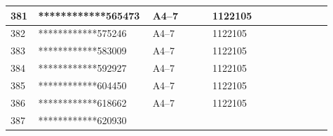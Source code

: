 \documentclass[UTF8,10pt,a4paper,fontset=fandol]{ctexart}
\newcommand{\fieldvalue}[1]{#1}
\begin{document}
\begin{center}
\begin{tabular}{|p{0.08\linewidth}|p{0.29\linewidth}|p{0.18\linewidth}|p{0.18\linewidth}|p{0.18\linewidth}|}
\fieldvalue{381}
&
\fieldvalue{************565473}
&
\fieldvalue{A4--7}
&
\fieldvalue{1122105}
& \\ \hline
\fieldvalue{382}
&
\fieldvalue{************575246}
&
\fieldvalue{A4--7}
&
\fieldvalue{1122105}
& \\ \hline
\fieldvalue{383}
&
\fieldvalue{************583009}
&
\fieldvalue{A4--7}
&
\fieldvalue{1122105}
& \\ \hline
\fieldvalue{384}
&
\fieldvalue{************592927}
&
\fieldvalue{A4--7}
&
\fieldvalue{1122105}
& \\ \hline
\fieldvalue{385}
&
\fieldvalue{************604450}
&
\fieldvalue{A4--7}
&
\fieldvalue{1122105}
& \\ \hline
\fieldvalue{386}
&
\fieldvalue{************618662}
&
\fieldvalue{A4--7}
&
\fieldvalue{1122105}
& \\ \hline
\fieldvalue{387}
&
\fieldvalue{************620930}

\end{tabular}
\end{center}
\end{document}
